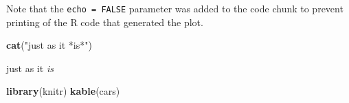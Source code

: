\documentclass[
]{book}
\newenvironment{Shaded}{\begin{snugshade}}{\end{snugshade}}
\newcommand{\FunctionTok}[1]{\textcolor[rgb]{0.13,0.29,0.53}{\textbf{#1}}}
\newcommand{\NormalTok}[1]{#1}
\newcommand{\StringTok}[1]{\textcolor[rgb]{0.31,0.60,0.02}{#1}}
\theoremstyle{definition}
\theoremstyle{definition}
\theoremstyle{definition}
\theoremstyle{definition}
\theoremstyle{remark}
\begin{document}
Note that the \texttt{echo\ =\ FALSE} parameter was added to the code chunk to prevent printing of the R code that generated the plot.

\begin{Shaded}
\begin{Highlighting}[]
\FunctionTok{cat}\NormalTok{(}\StringTok{"just as it *is*"}\NormalTok{)}
\end{Highlighting}
\end{Shaded}

just as it \emph{is}

\begin{Shaded}
\begin{Highlighting}[]
\FunctionTok{library}\NormalTok{(knitr)}
\FunctionTok{kable}\NormalTok{(cars)}
\end{Highlighting}
\end{Shaded}
\end{document}
